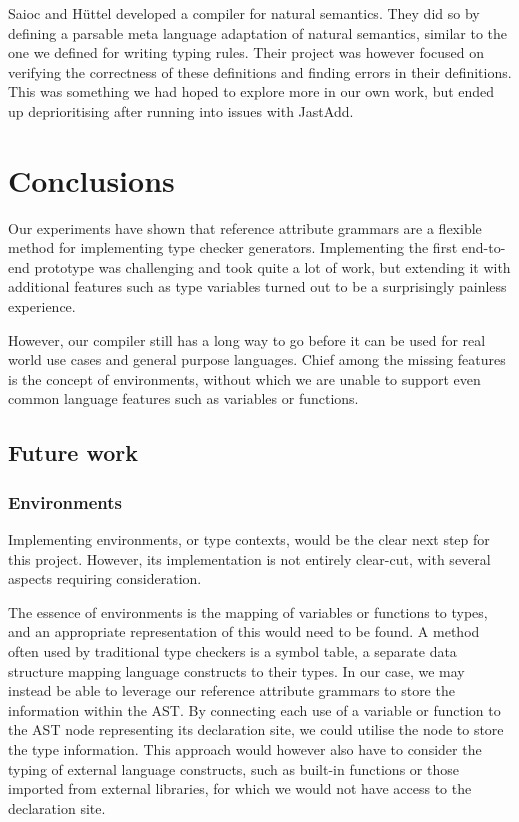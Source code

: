 \documentclass[nofilelist]{cslthse-msc}
\begin{document}
Saioc and Hüttel developed a compiler for natural semantics\cite{Saioc_2022}.
They did so by defining a parsable meta language adaptation of natural semantics, similar to the one we defined for writing typing rules.
Their project was however focused on verifying the correctness of these definitions and finding errors in their definitions.
This was something we had hoped to explore more in our own work, but ended up deprioritising after running into issues with JastAdd.


\chapter{Conclusions} %
Our experiments have shown that reference attribute grammars are a flexible method for implementing type checker generators.
Implementing the first end-to-end prototype was challenging and took quite a lot of work, but extending it with additional features such as type variables turned out to be a surprisingly painless experience.

However, our compiler still has a long way to go before it can be used for real world use cases and general purpose languages.
Chief among the missing features is the concept of environments, without which we are unable to support even common language features such as variables or functions.

\section{Future work}
\subsection{Environments}\label{futureworkenvironments}
Implementing environments, or type contexts, would be the clear next step for this project.
However, its implementation is not entirely clear-cut, with several aspects requiring consideration.

The essence of environments is the mapping of variables or functions to types, and an appropriate representation of this would need to be found.
A method often used by traditional type checkers is a symbol table, a separate data structure mapping language constructs to their types.
In our case, we may instead be able to leverage our reference attribute grammars to store the information within the AST.
By connecting each use of a variable or function to the AST node representing its declaration site, we could utilise the node to store the type information.
This approach would however also have to consider the typing of external language constructs, such as built-in functions or those imported from external libraries, for which we would not have access to the declaration site.
\end{document}
